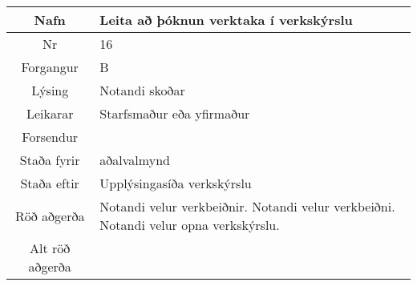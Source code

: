 \documentclass[a4paper]{article}
\begin{document}
\begin{tabular}{|c|p{10cm}|}
\hline
Nafn&Leita að þóknun verktaka í verkskýrslu\\
\hline
Nr&16\\
\hline
Forgangur&B\\
\hline
Lýsing&Notandi skoðar\\
\hline
Leikarar&Starfsmaður eða yfirmaður\\
\hline
Forsendur&\\
\hline
Staða fyrir&aðalvalmynd\\
\hline
Staða eftir&Upplýsingasíða verkskýrslu\\
\hline
Röð aðgerða&Notandi velur verkbeiðnir. Notandi velur verkbeiðni. Notandi velur opna verkskýrslu.\\
\hline
Alt röð aðgerða&\\
\hline
\end{tabular}
\end{document}
